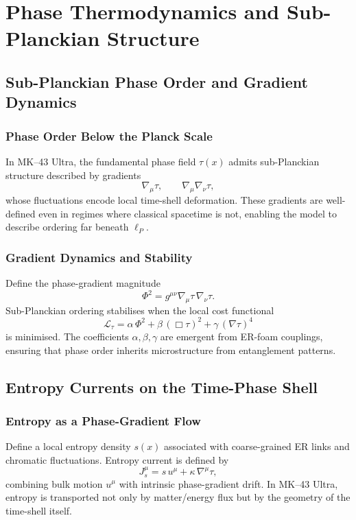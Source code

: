 

\part{Phase Thermodynamics and Sub-Planckian Structure}

\chapter{Sub-Planckian Phase Order and Gradient Dynamics}

\section{Phase Order Below the Planck Scale}

In MK--43 Ultra, the fundamental phase field $\tau(x)$ admits sub-Planckian structure described by gradients
\[
\nabla_\mu \tau,\qquad \nabla_\mu \nabla_\nu \tau,
\]
whose fluctuations encode local time-shell deformation.
These gradients are well-defined even in regimes where classical spacetime is not, enabling the model to describe ordering far beneath $\ell_P$.

\section{Gradient Dynamics and Stability}

Define the phase-gradient magnitude
\[
\Phi^2 = g^{\mu\nu} \nabla_\mu \tau\, \nabla_\nu \tau.
\]
Sub-Planckian ordering stabilises when the local cost functional
\[
\mathcal{L}_\tau = \alpha\, \Phi^2 + \beta\, (\Box \tau)^2 + \gamma\, (\nabla \tau)^4
\]
is minimised.
The coefficients $\alpha,\beta,\gamma$ are emergent from ER-foam couplings, ensuring that phase order inherits microstructure from entanglement patterns.

\chapter{Entropy Currents on the Time-Phase Shell}

\section{Entropy as a Phase-Gradient Flow}

Define a local entropy density $s(x)$ associated with coarse-grained ER links and chromatic fluctuations.
Entropy current is defined by
\[
J^\mu_s = s\, u^\mu + \kappa\, \nabla^\mu \tau,
\]
combining bulk motion $u^\mu$ with intrinsic phase-gradient drift.
In MK--43 Ultra, entropy is transported not only by matter/energy flux but by the geometry of the time-shell itself.

